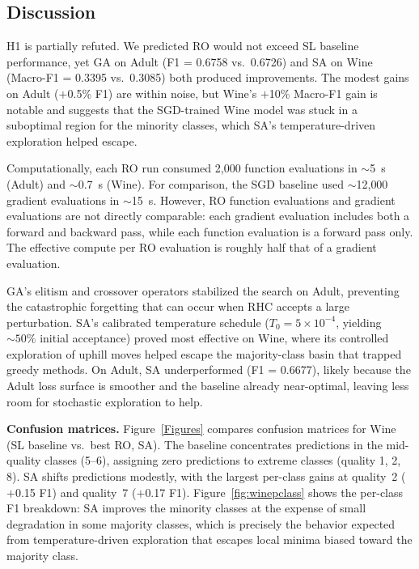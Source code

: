 \documentclass[10 pt, twocolumn]{article}
\begin{document}
\subsection{Discussion}

H1 is partially refuted. We predicted RO would not exceed SL baseline performance, yet GA on Adult (F1 = 0.6758 vs.\ 0.6726) and SA on Wine (Macro-F1 = 0.3395 vs.\ 0.3085) both produced improvements. The modest gains on Adult ($+$0.5\% F1) are within noise, but Wine's $+$10\% Macro-F1 gain is notable and suggests that the SGD-trained Wine model was stuck in a suboptimal region for the minority classes, which SA's temperature-driven exploration helped escape.

Computationally, each RO run consumed 2{,}000 function evaluations in $\sim$5~s (Adult) and $\sim$0.7~s (Wine). For comparison, the SGD baseline used $\sim$12{,}000 gradient evaluations in $\sim$15~s. However, RO function evaluations and gradient evaluations are not directly comparable: each gradient evaluation includes both a forward and backward pass, while each function evaluation is a forward pass only. The effective compute per RO evaluation is roughly half that of a gradient evaluation.

GA's elitism and crossover operators stabilized the search on Adult, preventing the catastrophic forgetting that can occur when RHC accepts a large perturbation. SA's calibrated temperature schedule ($T_0 = 5 \times 10^{-4}$, yielding ${\sim}50\%$ initial acceptance) proved most effective on Wine, where its controlled exploration of uphill moves helped escape the majority-class basin that trapped greedy methods. On Adult, SA underperformed (F1 = 0.6677), likely because the Adult loss surface is smoother and the baseline already near-optimal, leaving less room for stochastic exploration to help.

\textbf{Confusion matrices.} Figure~\ref{Figures} compares confusion matrices for Wine (SL baseline vs.\ best RO, SA). The baseline concentrates predictions in the mid-quality classes (5--6), assigning zero predictions to extreme classes (quality 1, 2, 8). SA shifts predictions modestly, with the largest per-class gains at quality~2 ($+$0.15 F1) and quality~7 ($+$0.17 F1). Figure~\ref{fig:winepclass} shows the per-class F1 breakdown: SA improves the minority classes at the expense of small degradation in some majority classes, which is precisely the behavior expected from temperature-driven exploration that escapes local minima biased toward the majority class.
\end{document}
